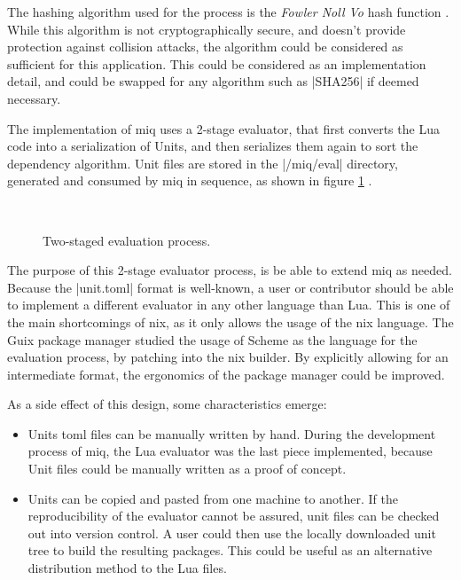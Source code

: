 The hashing algorithm used for the process is the
\textit{Fowler Noll Vo} hash function \cite{FnvRust}. While
this algorithm is not cryptographically secure, and doesn't
provide protection against collision attacks, the algorithm
could be considered as sufficient for this application. This
could be considered as an implementation detail, and could
be swapped for any algorithm such as |SHA256| if deemed
necessary.

The implementation of miq uses a 2-stage evaluator, that
first converts the Lua code into a serialization of Units,
and then serializes them again to sort the dependency
algorithm. Unit files are stored in the |/miq/eval|
directory, generated and consumed by miq in sequence, as
shown in figure \ref{fig:2stage} .

\begin{figure}[hbt]
    \centerfloat
    \
    \caption{Two-staged evaluation process.}
    \label{fig:2stage}
\end{figure}

The purpose of this 2-stage evaluator process, is be able to
extend miq as needed. Because the |unit.toml| format is
well-known, a user or contributor should be able to
implement a different evaluator in any other language than
Lua. This is one of the main shortcomings of nix, as it
only allows the usage of the nix language. The Guix package
manager \cite{courtesFunctionalPackageManagement2013}
studied the usage of Scheme as the language for the
evaluation process, by patching into the nix builder. By
explicitly allowing for an intermediate format, the
ergonomics of the package manager could be improved.

As a side effect of this design, some characteristics
emerge:

\begin{itemize}
    \item Units toml files can be manually written by hand.
    During the development process of miq, the Lua evaluator
    was the last piece implemented, because Unit files could
    be manually written as a proof of concept.
    \item Units can be copied and pasted from one machine to
    another. If the reproducibility of the evaluator cannot
    be assured, unit files can be checked out into version
    control. A user could then use the locally downloaded
    unit tree to build the resulting packages. This could be
    useful as an alternative distribution method to the Lua files.
\end{itemize}
